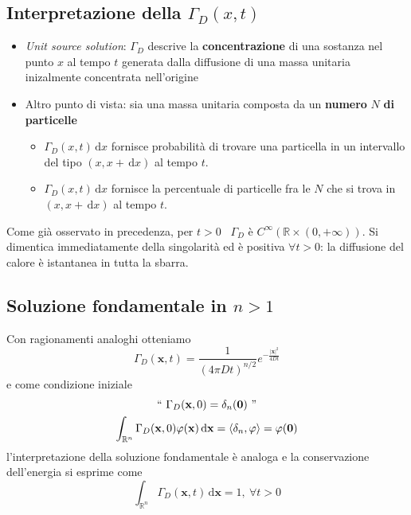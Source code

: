 \documentclass[10pt,a4paper,twoside,openright]{book}
\newcommand{\x}{\mathbf{x}}
\newcommand{\zer}{\mathbf{0}}
\newcommand{\de}{\,\mathrm d}
\newcommand{\dx}{\de x}
\newcommand{\dxx}{\de \x}
\begin{document}
\subsection{Interpretazione della \texorpdfstring{$\displaystyle \Gamma _{D}(x,t)$}{soluzione}}
\begin{itemize}
    \item \textit{Unit source solution}: $\displaystyle \Gamma _{D}$ descrive la \textbf{concentrazione} di una sostanza nel punto $x$ al tempo $t$ generata dalla diffusione di una massa unitaria inizalmente concentrata nell'origine
    \item Altro punto di vista: sia una massa unitaria composta da un \textbf{numero }$N$\textbf{ di particelle}
          \begin{itemize}
              \item $\displaystyle \Gamma _{D}(x,t) \dx$ fornisce probabilità di trovare una particella in un intervallo del tipo $\displaystyle (x,x+\dx)$ al tempo $t$.
              \item $\displaystyle \Gamma _{D}(x,t) \dx$ fornisce la percentuale di particelle fra le $N$ che si trova in $\displaystyle (x,x+\dx)$ al tempo $t$.
          \end{itemize}
\end{itemize}
\begin{nb}
    Come già osservato in precedenza, per $t >0$ \ $\displaystyle \Gamma _{D}$ è $\displaystyle C^{\infty }(\mathbb{R} \times (0,+\infty))$. Si dimentica immediatamente della singolarità ed è positiva $\displaystyle \forall t >0$: la diffusione del calore è istantanea in tutta la sbarra.
\end{nb}
\subsection{Soluzione fondamentale in \texorpdfstring{$n>1$}{n>1}}

Con ragionamenti analoghi otteniamo
\begin{equation*}
    \Gamma _{D}(\x,t) =\frac{1}{(4\pi Dt)^{n/2}} e^{-\frac{| \x| ^{2}}{4Dt}}
\end{equation*}
e come condizione iniziale
\begin{gather*}
    ``\ \Gamma _{D}(\x,0) =\delta _{n}(\zer) \ "\\
    \int _{\mathbb{R}^{n}} \Gamma _{D}(\x,0) \varphi (\x) \dxx =\langle \delta _{n},\varphi \rangle =\varphi (\zer)
\end{gather*}
l'interpretazione della soluzione fondamentale è analoga e la conservazione dell'energia si esprime come
\begin{equation*}
    \int _{\mathbb{R}^{n}} \Gamma _{D}(\x,t) \dxx =1,\ \forall t >0
\end{equation*}
\end{document}
